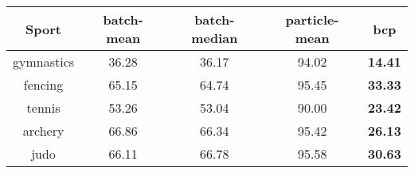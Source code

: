 \begin{tabular}{|c|c|c|c|c|}
\hline
Sport & batch-mean & batch-median & particle-mean & bcp \\
\hline
gymnastics & 36.28 & 36.17 & 94.02 & \textbf{14.41} \\
fencing & 65.15 & 64.74 & 95.45 & \textbf{33.33} \\
tennis & 53.26 & 53.04 & 90.00 & \textbf{23.42} \\
archery & 66.86 & 66.34 & 95.42 & \textbf{26.13} \\
judo & 66.11 & 66.78 & 95.58 & \textbf{30.63} \\
\hline
\end{tabular}
